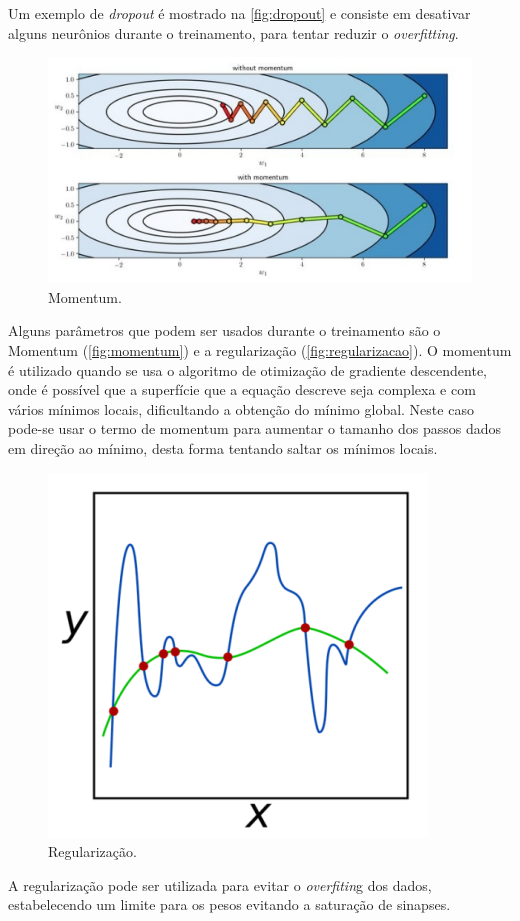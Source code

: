 \documentclass[sigconf, nonacm, screen]{acmart}
\begin{document}
Um exemplo de \textit{dropout} é mostrado na \autoref{fig:dropout} e consiste em desativar alguns neurônios durante o treinamento, para tentar reduzir o \textit{overfitting}.

\begin{figure}[ht]
	\centering
	\includegraphics[width=0.9\linewidth]{img/momentum}
	\caption{Momentum.}
	\label{fig:momentum}
\end{figure}

Alguns parâmetros que podem ser usados durante o treinamento são o Momentum (\autoref{fig:momentum}) e a regularização (\autoref{fig:regularizacao}). O momentum é utilizado quando se usa o algoritmo de otimização de gradiente descendente, onde é possível que a superfície que a equação descreve seja complexa e com vários mínimos locais, dificultando a obtenção do mínimo global. Neste caso pode-se usar o termo de momentum para aumentar o tamanho dos passos dados em direção ao mínimo, desta forma tentando saltar os mínimos locais.

\begin{figure}[ht]
	\centering
	\includegraphics[width=0.5\linewidth]{img/regularizacao}
	\caption{Regularização.}
	\label{fig:regularizacao}
\end{figure}

A regularização pode ser utilizada para evitar o \textit{overfitin}g dos dados, estabelecendo um limite para os pesos evitando a saturação de sinapses.
\end{document}

